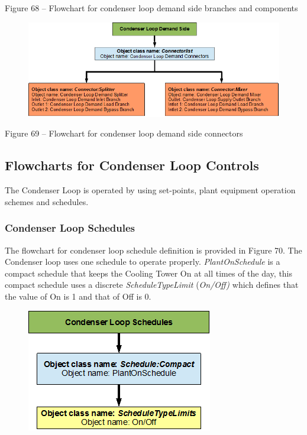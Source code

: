 Figure 68 -- Flowchart for condenser loop demand side branches and components

\begin{figure}[htbp]
\centering
\includegraphics{media/image069.png}
\caption{}
\end{figure}

Figure 69 -- Flowchart for condenser loop demand side connectors

\subsection{Flowcharts for Condenser Loop Controls}\label{flowcharts-for-condenser-loop-controls}

The Condenser Loop is operated by using set-points, plant equipment operation schemes and schedules.

\subsubsection{Condenser Loop Schedules}\label{condenser-loop-schedules}

The flowchart for condenser loop schedule definition is provided in Figure 70. The Condenser loop uses one schedule to operate properly. \emph{PlantOnSchedule} is a compact schedule that keeps the Cooling Tower On at all times of the day, this compact schedule uses a discrete \emph{ScheduleTypeLimit} (\emph{On/Off)} which defines that the value of On is 1 and that of Off is 0.

\begin{figure}[htbp]
\centering
\includegraphics{media/image070.png}
\caption{}
\end{figure}

